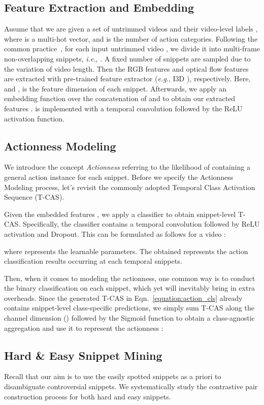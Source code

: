 \documentclass[final]{cvpr}
\begin{document}
\subsection{Feature Extraction and Embedding}
\label{subsec:featureExtract}
Assume that we are given a set of  untrimmed videos  and their video-level labels , where  is a multi-hot vector, and  is the number of action categories. Following the common practice~\cite{nguyen2018weakly,nguyen2019weakly,lee2020background}, for each input untrimmed video , we divide it into multi-frame non-overlapping  snippets, \emph{i.e.}, . A fixed number of  snippets  are sampled due to the variation of video length. Then the RGB features  and optical flow features  are extracted with pre-trained feature extractor (\emph{e.g.}, I3D \cite{carreira2017quo}), respectively. Here,  and ,  is the feature dimension of each snippet. Afterwards, we apply an embedding function  over the concatenation of  and  to obtain our extracted features .  is implemented with a temporal convolution followed by the ReLU activation function.

\subsection{Actionness Modeling} \label{subsec:acModel}
We introduce the concept \textit{Actionness} referring to the likelihood of containing a general action instance for each snippet. Before we specify the Actionness Modeling process, let’s revisit the commonly adopted Temporal Class Activation Sequence (T-CAS).

Given the embedded features , we apply a classifier  to obtain snippet-level T-CAS. Specifically, the classifier contains a temporal convolution followed by ReLU activation and Dropout. This can be formulated as follows for a video :

\noindent where  represents the learnable parameters. The obtained  represents the action classification results occurring at each temporal snippets.

Then, when it comes to modeling the actionness, one common way is to conduct the binary classification on each snippet, which yet will inevitably bring in extra overheads. Since the generated T-CAS  in Eqn.~\ref{equation:action_cls} already contains snippet-level class-specific predictions, we simply sum T-CAS along the channel dimension () followed by the Sigmoid function to obtain a class-agnostic aggregation and use it to represent the actionness :


\subsection{Hard \& Easy Snippet Mining}
Recall that our aim is to use the easily spotted snippets as a priori to disambiguate controversial snippets. We systematically study the contrastive pair construction process for both hard and easy snippets.
\label{subsec:sampleSelect}
\end{document}
